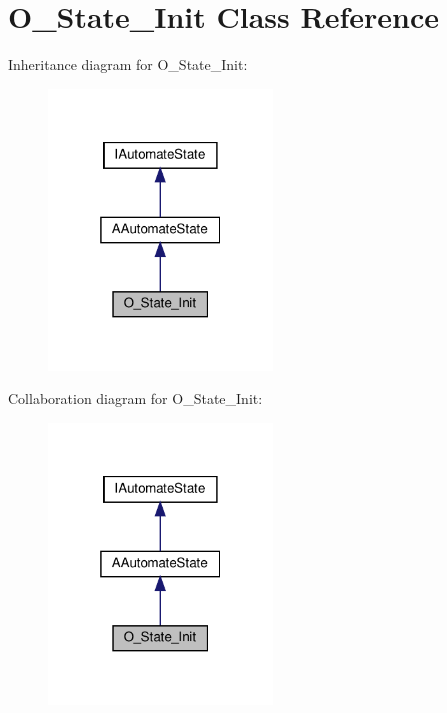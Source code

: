 \hypertarget{classO__State__Init}{}\section{O\+\_\+\+State\+\_\+\+Init Class Reference}
\label{classO__State__Init}


Inheritance diagram for O\+\_\+\+State\+\_\+\+Init\+:
\nopagebreak
\begin{figure}[H]
\begin{center}
\leavevmode
\includegraphics[width=169pt]{classO__State__Init__inherit__graph}
\end{center}
\end{figure}


Collaboration diagram for O\+\_\+\+State\+\_\+\+Init\+:
\nopagebreak
\begin{figure}[H]
\begin{center}
\leavevmode
\includegraphics[width=169pt]{classO__State__Init__coll__graph}
\end{center}
\end{figure}
